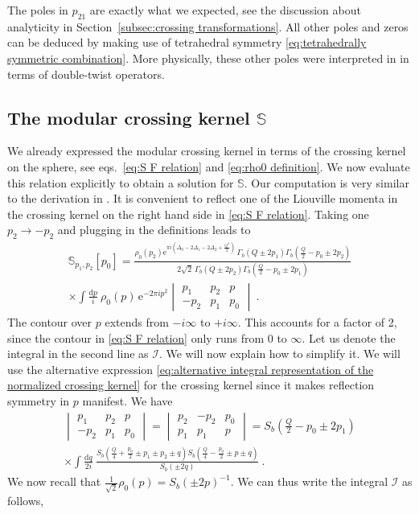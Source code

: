 \documentclass[12pt,a4paper]{article}
\renewcommand\d{\text{d}}
\newcommand{\sixjnorm}[6]{\begin{vmatrix}
#1 & #2 & #3 \\
#4 & #5 & #6
\end{vmatrix}
}
\begin{document}
The poles in $p_{21}$ are exactly what we expected, see the discussion about analyticity in Section~\ref{subsec:crossing transformations}.
All other poles and zeros can be deduced by making use of tetrahedral symmetry \eqref{eq:tetrahedrally symmetric combination}.
More physically, these other poles were interpreted in \cite{Collier:2018exn} in terms of double-twist operators.

\subsection{The modular crossing kernel \texorpdfstring{$\mathbb{S}$}{S}}
We already expressed the modular crossing kernel in terms of the crossing kernel on the sphere, see eqs.~\eqref{eq:S F relation} and \eqref{eq:rho0 definition}. We now evaluate this relation explicitly to obtain a solution for $\mathbb{S}$. Our computation is very similar to the derivation in \cite{Teschner:2013tqy}. It is convenient to reflect one of the Liouville momenta in the crossing kernel on the right hand side in \eqref{eq:S F relation}. Taking one $p_2 \to -p_2$ and plugging in the definitions leads to 
\begin{multline}
    \mathbb{S}_{p_1,p_2}[p_0]=\frac{\rho_0(p_2) \mathrm{e}^{\pi i(\Delta_0-2\Delta_1-2\Delta_2+\frac{Q^2}{2})}\, \Gamma_b(Q \pm 2 p_1) \Gamma_b(\frac{Q}{2}-p_0 \pm 2p_2)}{2\sqrt{2}\, \Gamma_b(Q \pm 2 p_2) \Gamma_b(\frac{Q}{2}- p_0 \pm 2 p_1)} \\
    \times \int \frac{\d p}{i} \ \rho_0(p)\,  \mathrm{e}^{-2\pi i p^2} \sixjnorm{p_1}{p_2}{p}{-p_2}{p_1}{p_0}\ .
\end{multline}
The contour over $p$ extends from $-i\infty$ to $+i\infty$. This accounts for a factor of 2, since the contour in \eqref{eq:S F relation} only runs from $0$ to $\infty$.
Let us denote the integral in the second line as $\mathcal{I}$. 
We will now explain how to simplify it. We will use the alternative expression \eqref{eq:alternative integral representation of the normalized crossing kernel} for the crossing kernel since it makes reflection symmetry in $p$ manifest. We have
\begin{multline}
    \sixjnorm{p_1}{p_2}{p}{-p_2}{p_1}{p_0}=\sixjnorm{p_2}{-p_2}{p_0}{p_1}{p_1}{p}=S_b(\tfrac{Q}{2}-p_0 \pm 2p_1) \\ \times \int \frac{\d q}{2i} \ \frac{S_b(\frac{Q}{4}+\frac{p_0}{2} \pm p_1 \pm p_2 \pm q) S_b(\frac{Q}{4}-\frac{p_0}{2} \pm p \pm q)}{S_b( \pm 2 q)}\ .
\end{multline}
We now recall that $\frac{1}{\sqrt{2}}\rho_0(p)= S_b(\pm 2p)^{-1}$. We can thus write the integral $\mathcal{I}$ as follows,
\end{document}
